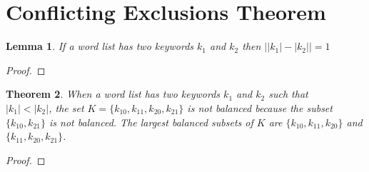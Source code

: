 \documentclass{article}
\newtheorem{theorem}{Theorem}[section]
\newtheorem{lemma}[theorem]{Lemma}
\begin{document}
    
\section{Conflicting Exclusions Theorem}
\begin{lemma}
    If a word list has two keywords $k_1$ and $k_2$ then $\Big | |k_1| - |k_2| \Big | = 1$
\end{lemma}
\begin{proof}
\end{proof}
\begin{theorem}
    When a word list has two keywords $k_1$ and $k_2$ such that \\ $|k_1|<|k_2|$, the set $K = \{k_10, k_11, k_20, k_21\}$ is not balanced because the subset $\{k_10, k_21\}$ is not balanced. The largest balanced subsets of $K$ are $\{k_10, k_11, k_20\}$ and $\{k_11, k_20, k_21\}$.
\end{theorem}

\begin{proof}
\end{proof}
\end{document}
